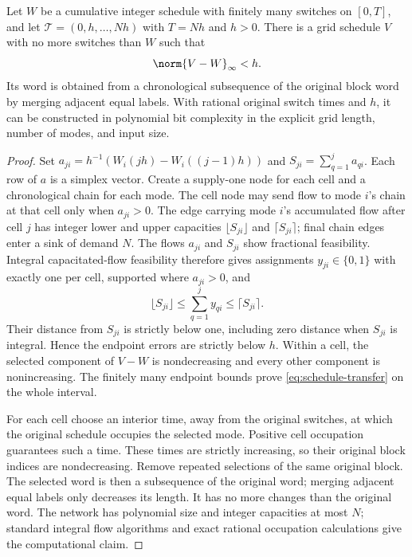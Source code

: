 \begin{theorem}\label{thm:sharp-transfer}
Let $W$ be a cumulative integer schedule with finitely many switches on
$[0,T]$, and let $\mathcal T=(0,h,\ldots,Nh)$ with $T=Nh$ and $h>0$.
There is a grid schedule $V$ with no more switches than $W$ such that
\begin{equation}\label{eq:schedule-transfer}
 \norm{V-W}_\infty<h.
\end{equation}
Its word is obtained from a chronological subsequence of the original block
word by merging adjacent equal labels. With rational original switch times
and $h$, it can be constructed in polynomial bit complexity in the explicit
grid length, number of modes, and input size.
\end{theorem}
\begin{proof}
Set $a_{ji}=h^{-1}(W_i(jh)-W_i((j-1)h))$ and
$S_{ji}=\sum_{q=1}^j a_{qi}$. Each row of $a$ is a simplex vector. Create
a supply-one node for each cell and a chronological chain for each mode.
The cell node may send flow to mode $i$'s chain at that cell only when
$a_{ji}>0$. The edge carrying mode $i$'s accumulated flow after cell $j$
has integer lower and upper capacities $\lfloor S_{ji}\rfloor$ and
$\lceil S_{ji}\rceil$; final chain edges enter a sink of demand $N$.
The flows $a_{ji}$ and $S_{ji}$ show fractional feasibility. Integral
capacitated-flow feasibility therefore gives assignments $y_{ji}\in\{0,1\}$
with exactly one per cell, supported where $a_{ji}>0$, and
\[
 \lfloor S_{ji}\rfloor\le\sum_{q=1}^j y_{qi}
 \le\lceil S_{ji}\rceil.
\]
Their distance from $S_{ji}$ is strictly below one, including zero distance
when $S_{ji}$ is integral. Hence the endpoint errors are strictly below $h$.
Within a cell, the selected component of $V-W$ is nondecreasing and every
other component is nonincreasing. The finitely many endpoint bounds prove
\eqref{eq:schedule-transfer} on the whole interval.

For each cell choose an interior time, away from the original switches,
at which the original schedule occupies the selected mode. Positive cell
occupation guarantees such a time. These times are strictly increasing, so
their original block indices are nondecreasing. Remove repeated selections
of the same original block. The selected word is then a subsequence of the
original word; merging adjacent equal labels only decreases its length.
It has no more changes than the original word. The network has polynomial
size and integer capacities at most $N$; standard integral flow algorithms
and exact rational occupation calculations give the computational claim.
\end{proof}

